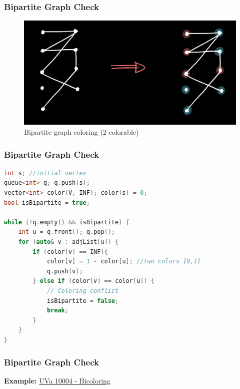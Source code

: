 \documentclass{beamer}
\begin{document}
\begin{frame}[fragile]
\frametitle{Bipartite Graph Check}

\begin{figure}[H]
    \centering
    \includegraphics[scale=0.2]{imgs/bipartite.jpeg}
    \caption{Bipartite graph coloring (2-colorable)}
\end{figure}

\end{frame}

\begin{frame}[fragile]
\frametitle{Bipartite Graph Check}

\begin{lstlisting}[language=c]
int s; //initial vertex
queue<int> q; q.push(s);
vector<int> color(V, INF); color[s] = 0;
bool isBipartite = true;

while (!q.empty() && isBipartite) {
	int u = q.front(); q.pop();
	for (auto& v : adjList[u]) {
		if (color[v] == INF){
			color[v] = 1 - color[u]; //two colors {0,1}
			q.push(v);
		} else if (color[v] == color[u]) {
			// Coloring conflict
			isBipartite = false;
			break;
		}
	}
}
\end{lstlisting}

\end{frame}

\begin{frame}[fragile]
\frametitle{Bipartite Graph Check}

\textbf{Example:} \href{https://onlinejudge.org/external/100/10004.pdf}{UVa 10004 - Bicoloring}

\end{frame}
\end{document}
